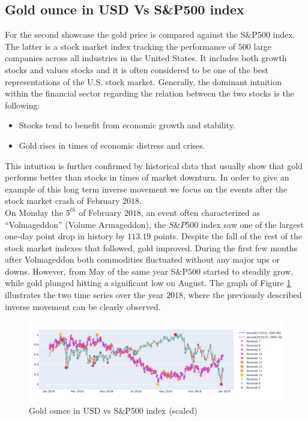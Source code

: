 \documentclass[a4, 11pt]{article}
\begin{document}
\subsection{Gold ounce in USD Vs S\&P500 index}
For the second showcase the gold price is compared against the S$\&$P$500$ index. The latter is a stock market index tracking the performance of $500$ large companies across all industries in the United States. It includes both growth stocks and values stocks and it is often considered to be one of the best representations of the U.S. stock market. Generally, the dominant intuition within the financial sector regarding the relation between the two stocks is the following: 
\begin{itemize}
    \item Stocks tend to benefit from economic growth and stability.
    \item Gold rises in times of economic distress and crises.
\end{itemize}
This intuition is further confirmed by historical data that usually show that gold performs better than stocks in times of market downturn. In order to give an example of this long term inverse movement we focus on the events after the stock market crash of February $2018$.\\[2ex]
On Monday the $5^{th}$ of February $2018$, an event often characterized as “Volmageddon” (Volume Armageddon), the $S\&P500$ index saw one of the largest one-day point drop in history by $113.19$ points. Despite the fall of the rest of the stock market indexes that followed, gold improved. During the first few months after Volmageddon both commodities fluctuated without any major ups or downs. However, from May of the same year S$\&$P$500$ started to steadily grow, while gold plunged hitting a significant low on August. The graph of Figure \ref{fig:GoldSP500Scalled} illustrates the two time series over the year $2018$, where the previously described inverse movement can be clearly observed. 
\begin{figure}[!ht]
    \centering
    \includegraphics[width=1.05\textwidth]{Images/GoldSP500.png}
    \caption{Gold ounce in USD vs S$\&$P500 index  (scaled)}
    \label{fig:GoldSP500Scalled}
\end{figure}
\end{document}
